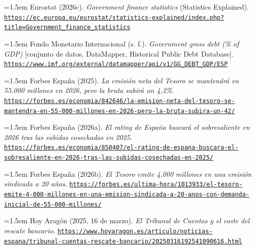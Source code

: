 \documentclass[10pt,a4paper]{article}
\begin{document}
\noindent\hangindent=1.5em Eurostat (2026c). \textit{Government finance statistics} (Statistics Explained). \href{https://ec.europa.eu/eurostat/statistics-explained/index.php?title=Government_finance_statistics}{\nolinkurl{https://ec.europa.eu/eurostat/statistics-explained/index.php?title=Government_finance_statistics}}

\noindent\hangindent=1.5em Fondo Monetario Internacional (s. f.). \textit{Government gross debt (\% of GDP)} [conjunto de datos, DataMapper, Historical Public Debt Database]. \href{https://www.imf.org/external/datamapper/api/v1/GG_DEBT_GDP/ESP}{\nolinkurl{https://www.imf.org/external/datamapper/api/v1/GG_DEBT_GDP/ESP}}

\noindent\hangindent=1.5em Forbes España (2025). \textit{La emisión neta del Tesoro se mantendrá en 55.000 millones en 2026, pero la bruta subirá un 4,2\%}. \href{https://forbes.es/economia/842646/la-emision-neta-del-tesoro-se-mantendra-en-55-000-millones-en-2026-pero-la-bruta-subira-un-42/}{\nolinkurl{https://forbes.es/economia/842646/la-emision-neta-del-tesoro-se-mantendra-en-55-000-millones-en-2026-pero-la-bruta-subira-un-42/}}

\noindent\hangindent=1.5em Forbes España (2026a). \textit{El rating de España buscará el sobresaliente en 2026 tras las subidas cosechadas en 2025}. \href{https://forbes.es/economia/850407/el-rating-de-espana-buscara-el-sobresaliente-en-2026-tras-las-subidas-cosechadas-en-2025/}{\nolinkurl{https://forbes.es/economia/850407/el-rating-de-espana-buscara-el-sobresaliente-en-2026-tras-las-subidas-cosechadas-en-2025/}}

\noindent\hangindent=1.5em Forbes España (2026b). \textit{El Tesoro emite 4.000 millones en una emisión sindicada a 20 años}. \href{https://forbes.es/ultima-hora/1013933/el-tesoro-emite-4-000-millones-en-una-emision-sindicada-a-20-anos-con-demanda-inicial-de-55-000-millones/}{\nolinkurl{https://forbes.es/ultima-hora/1013933/el-tesoro-emite-4-000-millones-en-una-emision-sindicada-a-20-anos-con-demanda-inicial-de-55-000-millones/}}

\noindent\hangindent=1.5em Hoy Aragón (2025, 16 de marzo). \textit{El Tribunal de Cuentas y el coste del rescate bancario}. \href{https://www.hoyaragon.es/articulo/noticias-espana/tribunal-cuentas-rescate-bancario/20250316192541090616.html}{\nolinkurl{https://www.hoyaragon.es/articulo/noticias-espana/tribunal-cuentas-rescate-bancario/20250316192541090616.html}}
\end{document}
